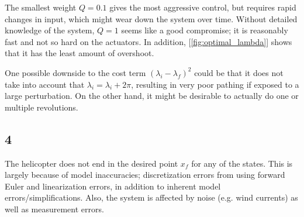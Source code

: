 The smallest weight $Q=0.1$ gives the most aggressive control, but requires rapid changes in input, which might wear down the system over time. Without detailed knowledge of the system, $Q=1$ seems like a good compromise; it is reasonably fast and not so hard on the actuators. In addition, [\ref{fig:optimal_lambda}] shows that it has the least amount of overshoot. 

One possible downside to the cost term $(\lambda_i - \lambda_f)^2$ could be that it does not take into account that $\lambda_i = \lambda_ i + 2\pi$, resulting in very poor pathing if exposed to a large perturbation. On the other hand, it might be desirable to actually do one or multiple revolutions.

\subsection{4}
The helicopter does not end in the desired point $x_f$ for any of the states. This is largely  because of model inaccuracies; discretization errors from using forward Euler and linearization errors, in addition to inherent model errors/simplifications. Also, the system is affected by noise (e.g. wind currents) as well as measurement errors.
